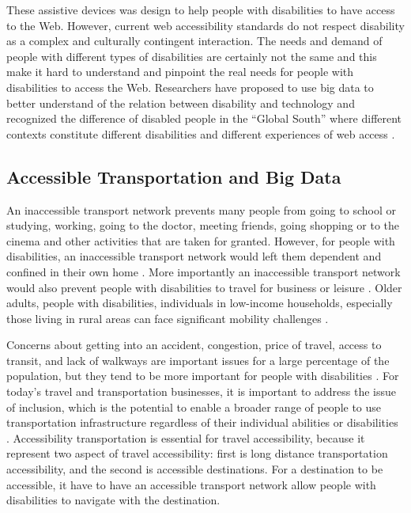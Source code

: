 These assistive devices was design to help people with disabilities 
to have access to the Web. However,  current web accessibility standards 
do not respect disability as a complex and culturally contingent interaction.
The needs and demand of people with different types of disabilities are 
certainly not the same and this make it hard to understand and pinpoint 
the real needs for people with disabilities to access the Web. Researchers 
have proposed to use big data to better understand of the relation between 
disability and technology and recognized the difference of disabled people 
in the ``Global South'' where different contexts constitute different 
disabilities and different experiences of web access \cite{Appleyard2005}.

\subsection{Accessible Transportation and Big Data}
An inaccessible transport network prevents many people from going to school 
or studying, working, going to the doctor, meeting friends, going shopping 
or to the cinema and other activities that are taken for granted. However,
for people with disabilities, an inaccessible transport
network would left them dependent and confined in their own home \cite{Ama}. 
More importantly an inaccessible transport network would also prevent people with disabilities to
travel for business or leisure \cite{milo}.
Older adults, people with disabilities, individuals in low-income households, especially 
those living in rural areas can face significant mobility challenges \cite{moya2016dynamic}. 

Concerns about getting into an accident, congestion,
price of travel, access to transit, and lack of walkways are important issues for a large
percentage of the population, but they tend to be more important for people with
disabilities \cite{moya2016dynamic}. For today's travel and transportation businesses,
it is important to address the issue of inclusion, which is the potential to enable 
a broader range of  people to use
transportation infrastructure regardless of their individual abilities or disabilities
\cite{milo}. Accessibility transportation is essential for travel accessibility, 
because it represent two aspect of travel accessibility: 
first is long distance transportation accessibility, and the second is accessible destinations. 
For a destination to be accessible, 
it have to have an accessible transport network allow people with disabilities 
to navigate with the destination.


